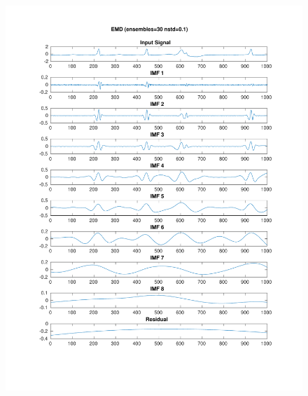 \documentclass[11pt,a4paper]{article}
\begin{document}
\begin{figure}[H]
\centering
\begin{minipage}{0.48\textwidth}
	\centering
	\includegraphics[width=\textwidth]{fig/221l1_emd_ensemble.pdf}
	

\end{minipage}
\end{figure}
\end{document}

